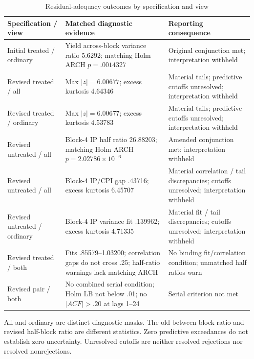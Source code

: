 \documentclass[11pt,a4paper]{article}
\begin{document}
\begin{table}[htbp]
\centering\small
\caption{Residual-adequacy outcomes by specification and view}\label{tab:residual}
\begin{tabularx}{\textwidth}{@{}P{.23\textwidth}LP{.27\textwidth}@{}}
\toprule
Specification / view & Matched diagnostic evidence & Reporting consequence \\
\midrule
Initial treated / ordinary & Yield across-block variance ratio 5.6292; matching Holm ARCH $p=.0014327$ & Original conjunction met; interpretation withheld \\
Revised treated / all & Max $|z|=6.00677$; excess kurtosis 4.64346 & Material tails; predictive cutoffs unresolved; interpretation withheld \\
Revised treated / ordinary & Max $|z|=6.00677$; excess kurtosis 4.53783 & Material tails; predictive cutoffs unresolved; interpretation withheld \\
Revised untreated / all & Block-4 IP half ratio 26.88203; matching Holm ARCH $p=2.02786\times10^{-6}$ & Amended conjunction met; interpretation withheld \\
Revised untreated / all & Block-4 IP/CPI gap .43716; excess kurtosis 6.45707 & Material correlation / tail discrepancies; cutoffs unresolved; interpretation withheld \\
Revised untreated / ordinary & Block-4 IP variance fit .139962; excess kurtosis 4.71335 & Material fit / tail discrepancies; cutoffs unresolved; interpretation withheld \\
Revised treated / both & Fits .85579--1.03200; correlation gaps do not cross .25; half-ratio warnings lack matching ARCH & No binding fit/correlation condition; unmatched half ratios warn \\
Revised pair / both & No combined serial condition; Holm LB not below .01; no $|ACF|>.20$ at lags 1--24 & Serial criterion not met \\
\bottomrule
\end{tabularx}
\par\smallskip\footnotesize All and ordinary are distinct diagnostic masks. The old between-block ratio and revised half-block ratio are different statistics. Zero predictive exceedances do not establish zero uncertainty. Unresolved cutoffs are neither resolved rejections nor resolved nonrejections.
\end{table}
\end{document}
